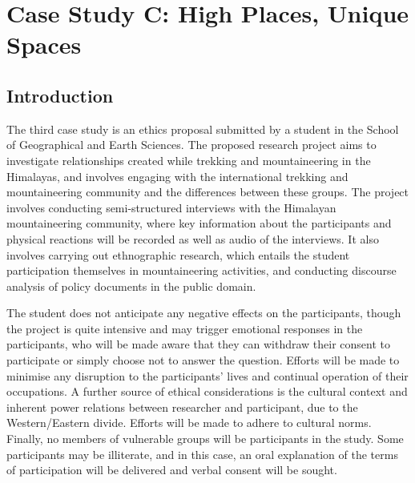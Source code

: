 \documentclass{l4proj}
\begin{document}
\section{Case Study C: High Places, Unique Spaces}

\subsection{Introduction}
The third case study is an ethics proposal submitted by a student in the School of Geographical and Earth Sciences. The proposed research project aims to investigate relationships created while trekking and mountaineering in the Himalayas, and involves engaging with the international trekking and mountaineering community and the differences between these groups. The project involves conducting semi-structured interviews with the Himalayan mountaineering community, where key information about the participants and physical reactions will be recorded as well as audio of the interviews. It also involves carrying out ethnographic research, which entails the student participation themselves in mountaineering activities, and conducting discourse analysis of policy documents in the public domain. 

The student does not anticipate any negative effects on the participants, though the project is quite intensive and may trigger emotional responses in the participants, who will be made aware that they can withdraw their consent to participate or simply choose not to answer the question. Efforts will be made to minimise any disruption to the participants' lives and continual operation of their occupations. A further source of ethical considerations is the cultural context and inherent power relations between researcher and participant, due to the Western/Eastern divide. Efforts will be made to adhere to cultural norms. Finally, no members of vulnerable groups will be participants in the study. Some participants may be illiterate, and in this case, an oral explanation of the terms of participation will be delivered and verbal consent will be sought. 
\end{document}
